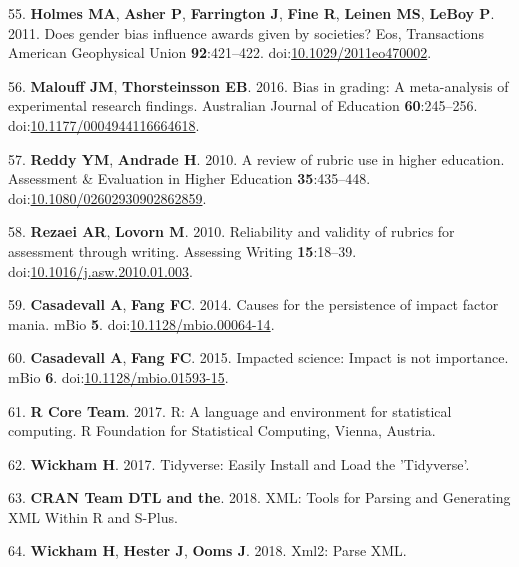 \documentclass[11pt,]{article}
\begin{document}
\hypertarget{ref-Holmes2011}{}
55. \textbf{Holmes MA}, \textbf{Asher P}, \textbf{Farrington J},
\textbf{Fine R}, \textbf{Leinen MS}, \textbf{LeBoy P}. 2011. Does gender
bias influence awards given by societies? Eos, Transactions American
Geophysical Union \textbf{92}:421--422.
doi:\href{https://doi.org/10.1029/2011eo470002}{10.1029/2011eo470002}.

\hypertarget{ref-Malouff2016}{}
56. \textbf{Malouff JM}, \textbf{Thorsteinsson EB}. 2016. Bias in
grading: A meta-analysis of experimental research findings. Australian
Journal of Education \textbf{60}:245--256.
doi:\href{https://doi.org/10.1177/0004944116664618}{10.1177/0004944116664618}.

\hypertarget{ref-Reddy2010}{}
57. \textbf{Reddy YM}, \textbf{Andrade H}. 2010. A review of rubric use
in higher education. Assessment \& Evaluation in Higher Education
\textbf{35}:435--448.
doi:\href{https://doi.org/10.1080/02602930902862859}{10.1080/02602930902862859}.

\hypertarget{ref-Rezaei2010}{}
58. \textbf{Rezaei AR}, \textbf{Lovorn M}. 2010. Reliability and
validity of rubrics for assessment through writing. Assessing Writing
\textbf{15}:18--39.
doi:\href{https://doi.org/10.1016/j.asw.2010.01.003}{10.1016/j.asw.2010.01.003}.

\hypertarget{ref-Casadevall2014}{}
59. \textbf{Casadevall A}, \textbf{Fang FC}. 2014. Causes for the
persistence of impact factor mania. mBio \textbf{5}.
doi:\href{https://doi.org/10.1128/mbio.00064-14}{10.1128/mbio.00064-14}.

\hypertarget{ref-Casadevall2015}{}
60. \textbf{Casadevall A}, \textbf{Fang FC}. 2015. Impacted science:
Impact is not importance. mBio \textbf{6}.
doi:\href{https://doi.org/10.1128/mbio.01593-15}{10.1128/mbio.01593-15}.

\hypertarget{ref-R_software_2017}{}
61. \textbf{R Core Team}. 2017. R: A language and environment for
statistical computing. R Foundation for Statistical Computing, Vienna,
Austria.

\hypertarget{ref-wickham_tidyverse_2017}{}
62. \textbf{Wickham H}. 2017. Tidyverse: Easily Install and Load the
'Tidyverse'.

\hypertarget{ref-duncan_xml_2018}{}
63. \textbf{CRAN Team DTL and the}. 2018. XML: Tools for Parsing and
Generating XML Within R and S-Plus.

\hypertarget{ref-wickham_xml2_2018}{}
64. \textbf{Wickham H}, \textbf{Hester J}, \textbf{Ooms J}. 2018. Xml2:
Parse XML.
\end{document}
